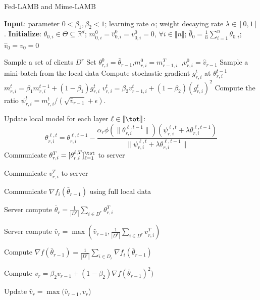\documentclass[nohyperref]{article}
\theoremstyle{plain}
\theoremstyle{definition}
\theoremstyle{remark}
\begin{document}
\begin{algorithm}[t]
\caption{ \colorbox{blue!20!white}{Fed-LAMB} and \colorbox{green!20!white}{Mime-LAMB} } \label{alg:ldams}
\begin{algorithmic}[1]
\STATE \textbf{Input}: parameter $0< \beta_1, \beta_2 <1$; learning rate $\alpha$; weight decaying rate $\lambda \in [0,1]$.
\STATE \textbf{Initialize}: $\theta_{0,i} \in \Theta \subseteq \mathbb R^d $; $m^0_{0,i}=\hat v^0_{0,i}=v^0_{0,i} = 0$, $\forall i\in \llbracket n\rrbracket$; $\bar{\theta}_0 =  \frac{1}{n} \sum_{i=1}^n \theta_{0,i}$; $\hat v_0=v_0=0$

\STATE Sample a set of clients $D^r$
\STATE Set $\theta_{r,i}^{0} = \bar{\theta}_{r-1}$,\quad $m^{0}_{r,i} = m^T_{r-1,i}$\ ,\quad $v^{0}_{r,i} = \hat{v}_{r-1}$
\STATE Sample a mini-batch from the local data
\STATE Compute stochastic gradient $g^t_{r,i}$ at $\theta_{r,i}^{t-1}$
\STATE $m^t_{r,i} = \beta_1 m^{t-1}_{r,i} + (1 - \beta_1) g^t_{r,i}$
\STATE \colorbox{blue!20!white}{$v^{t}_{r,i} = \beta_2 v^{t}_{r-1,i} + (1 - \beta_2) (g^t_{r,i})^2$ }
\STATE Compute the ratio  $\psi_{r,i}^t=m^{t}_{r,i}/(\sqrt{\hat v_{r-1}}+\epsilon)$. \label{line:scale}

\STATE \label{line:layer} Update local model for each layer $\ell \in \llbracket \tot \rrbracket$: 
\begin{equation}\label{eq:updatelayer}
    \theta_{r,i}^{\ell,t}=\theta_{r,i}^{\ell,t-1}-\frac{\alpha_{r}\phi(\|\theta_{r,i}^{\ell,t-1}\|)(\psi_{r,i}^{\ell,t}+\lambda \theta_{r,i}^{\ell,t-1})}{\|\psi_{r,i}^{\ell,t}+\lambda \theta_{r,i}^{\ell,t-1}\|} 
\end{equation} 
\ENDFOR
\STATE Communicate $\theta_{r,i}^{T} = [\theta_{r,i}^{\ell,T}]_{\ell =1}^{\tot}$ to server

\STATE \colorbox{blue!20!white}{Communicate $v_{r,i}^T$ to server}

\STATE \colorbox{green!20!white}{Communicate $\nabla f_i(\bar\theta_{r-1})$ using full local data}

\ENDFOR
\STATE Server compute $\bar{\theta}_r = \frac{1}{|D^{r}|} \sum_{i \in D^{r}} \theta_{r,i}^{T}$

\STATE \colorbox{blue!20!white}{Server compute $\hat{v}_{r} = \max( \hat{v}_{r-1},\frac{1}{|D^{r}|} \sum_{i \in D^{r}} v^T_{r,i} )$}

\STATE \colorbox{green!20!white}{Compute $\nabla f(\bar \theta_{r-1})=\frac{1}{|D^r|}\sum_{i\in D_r}\nabla f_i(\bar \theta_{r-1})$}

\STATE \colorbox{green!20!white}{Compute $v_r = \beta_2 v_{r-1}+(1-\beta_2)\nabla f(\bar \theta_{r-1})^2)$}

\STATE \colorbox{green!20!white}{Update $\hat v_{r}=\max(\hat v_{r-1},v_r$)}

\ENDFOR
\end{algorithmic}
\end{algorithm}
\end{document}
